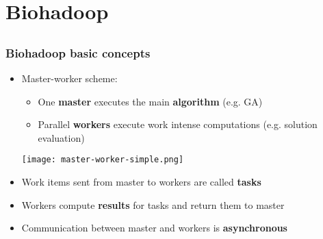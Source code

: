 \section{Biohadoop}
\subsection{}
\begin{frame}
  \frametitle{Biohadoop basic concepts}
  \begin{itemize}
    \item Master-worker scheme:
    \begin{itemize}
      \item One \textbf{master} executes the main \textbf{algorithm} (e.g. GA)
      \item Parallel \textbf{workers} execute work intense computations (e.g. solution evaluation)
    \end{itemize}
    \vspace{0.5em}
    \begin{center}
      \texttt{[image: master-worker-simple.png]}
    \end{center}
    \vspace{0.5em}
    \item Work items sent from master to workers are called \textbf{tasks}
    \item Workers compute \textbf{results} for tasks and return them to master
    \item Communication between master and workers is \textbf{asynchronous}
  \end{itemize}
\end{frame}
